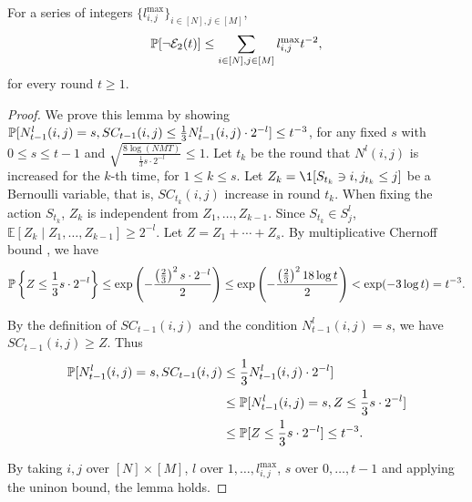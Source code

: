 \begin{lemma}\label{lemma:TPprob}
For a series of integers $\{l_{i,j}^{\max}\}_{i \in [N],j\in[M]}$, $${\mathbb{P}}[\neg \mathcal{E}_2(t)] \leq \sum_{i \in [N],j\in[M]} l_{i,j}^{\max} t^{-2},$$
for every round $t \geq 1$. 

\begin{proof}
We prove this lemma by showing ${\mathbb{P}}[N_{t-1}^l(i,j) = s, SC_{t-1}(i,j) \leq \frac{1}{3} N_{t-1}^l(i,j) \cdot 2^{-l}] \leq t^{-3}$, for any fixed $s$ with $0 \leq s \leq t - 1$ and $\sqrt{\frac{8 \log(NMT)}{\frac{1}{3} s \cdot 2^{-l}}} \leq 1$. Let $t_k$ be the round that $N^l(i,j)$ is increased for the $k$-th time, for $1 \leq k \leq s$. Let $Z_k = \1[S_{t_k} \ni i, j_{t_k} \le j]$ be a Bernoulli variable, that is, $SC_{t_k}(i,j)$ increase in round $t_k$. When fixing the action $S_{t_k}$, $Z_k$ is independent from $Z_1, \ldots, Z_{k-1}$. Since $S_{t_k} \in S_j^l$, $\mathbb{E}[Z_k \mid Z_1, \ldots, Z_{k-1}] \geq 2^{-l}$. Let $Z = Z_1 + \cdots + Z_s$. By multiplicative Chernoff bound \citep{upfal2005probability}, we have
\[
{\mathbb{P}}\left\{Z \leq \frac{1}{3} s \cdot 2^{-l}\right\} \leq \exp\left(-\frac{\left(\frac{2}{3}\right)^2 s \cdot 2^{-l}}{2}\right) \leq \exp\left(-\frac{\left(\frac{2}{3}\right)^2 18 \log t}{2}\right) < \exp(-3 \log t) = t^{-3}.
\]

By the definition of $SC_{t-1}(i,j)$ and the condition $N_{t-1}^l(i,j) = s$, we have $SC_{t-1}(i,j) \geq Z$. Thus
\begin{align*}
{\mathbb{P}}[N_{t-1}^l(i,j) = s, SC_{t-1}(i,j) &\leq \frac{1}{3} N_{t-1}^l(i,j) \cdot 2^{-l}]\\
&\leq {\mathbb{P}}[N_{t-1}^l(i,j) = s, Z \leq \frac{1}{3} s \cdot 2^{-l}] \\
&\leq {\mathbb{P}}[Z \leq \frac{1}{3} s \cdot 2^{-l}] \leq t^{-3}.
\end{align*}

By taking $i,j$ over $[N]\times[M]$, $l$ over $1, \ldots, l_{i,j}^{\max}$, $s$ over $0, \ldots, t - 1$ and applying the uninon bound, the lemma holds.
\end{proof}
\end{lemma}

